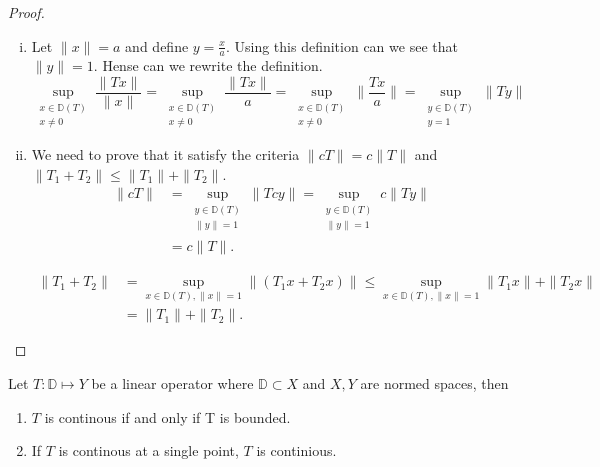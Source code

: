 \documentclass{article}
\theoremstyle{remark}
\begin{document}
\newpage
\begin{proof}
  \begin{enumerate}[(i)]
    \item Let $\|x\| = a $ and define $y = \frac{x}{a}$. Using this definition can we see that $ \|y\|= 1$. Hense can we rewrite the definition. \[
        \sup_{\substack{x \in \mathbb{D}\left( T \right) \\ x \neq 0} } \frac{\|Tx\|}{\|x\|} = \sup_{\substack{x \in \mathbb{D}\left( T \right) \\ x \neq 0} } \frac{\|Tx\|}{a} = \sup_{\substack{x \in \mathbb{D}\left( T \right) \\ x \neq 0} } \|\frac{Tx}{a}\| = \sup_{\substack{y \in \mathbb{D}\left( T \right)  \\ y = 1 }  }  \|Ty\|
    \] 

    \item We need to prove that it satisfy the criteria $\|cT\| = c\|T\|$ and $\|T_1 + T_2\| \le \|T_1\| + \|T_{2}\| $. 
      \begin{align*}
        \|cT\| &= \sup_{\substack{ y \in \mathbb{D}\left( T \right) \\ \|y\| = 1 } }  \|Tcy\|  = \sup_{\substack{ y \in \mathbb{D}\left( T \right) \\ \|y\| = 1 } }  c\|Ty\|   \\ &=  c \|T\| 
      .\end{align*}

      \begin{align*}
        \label{eq:label}
        \|T_{1} + T_{2}\| &= \sup_{x \in \mathbb{D}\left( T \right), \|x\| = 1} \|\left(  T_1x + T_2x \right)\|  \le \sup_{x \in \mathbb{D}\left( T \right), \|x\| = 1} \| T_1x \|  +\|T_2x\| \\ &= \|T_1\| + \|T_2\| 
      .\end{align*}
  \end{enumerate}
\end{proof}


\begin{theorem}
  Let $T: \mathbb{D} \mapsto Y$ be a linear operator where $\mathbb{D} \subset X  $ and $X, Y$ are normed spaces, then
  \begin{enumerate}
    \item $T$ is continous if and only if T is bounded. 
    \item If $T$  is continous at a single point, $T$ is continious.  
  \end{enumerate}
\end{theorem}
\end{document}
